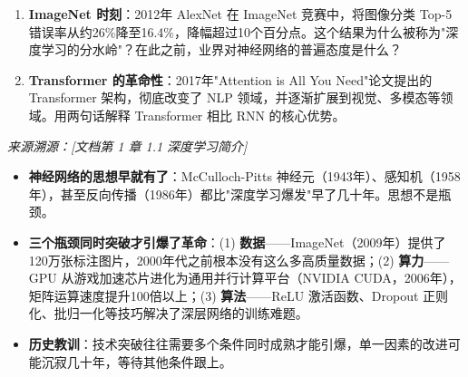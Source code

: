 \documentclass[a4paper,11pt]{ctexart}
\begin{document}
\begin{problembox}
\begin{enumerate}[(1)]
        \item \textbf{ImageNet 时刻}：2012年 AlexNet 在 ImageNet 竞赛中，将图像分类 Top-5 错误率从约26\%降至16.4\%，降幅超过10个百分点。这个结果为什么被称为"深度学习的分水岭"？在此之前，业界对神经网络的普遍态度是什么？

        \item \textbf{Transformer 的革命性}：2017年"Attention is All You Need"论文提出的 Transformer 架构，彻底改变了 NLP 领域，并逐渐扩展到视觉、多模态等领域。用两句话解释 Transformer 相比 RNN 的核心优势。
    \end{enumerate}

    \vspace{0.2cm}
    {\color{gray}\small\textit{来源溯源：[文档第 1 章 1.1 深度学习简介]}}
\end{problembox}

\begin{beginnerbox}
    \begin{itemize}
        \item \textbf{神经网络的思想早就有了}：McCulloch-Pitts 神经元（1943年）、感知机（1958年），甚至反向传播（1986年）都比"深度学习爆发"早了几十年。思想不是瓶颈。
        \item \textbf{三个瓶颈同时突破才引爆了革命}：(1) \textbf{数据}——ImageNet（2009年）提供了120万张标注图片，2000年代之前根本没有这么多高质量数据；(2) \textbf{算力}——GPU 从游戏加速芯片进化为通用并行计算平台（NVIDIA CUDA，2006年），矩阵运算速度提升100倍以上；(3) \textbf{算法}——ReLU 激活函数、Dropout 正则化、批归一化等技巧解决了深层网络的训练难题。
        \item \textbf{历史教训}：技术突破往往需要多个条件同时成熟才能引爆，单一因素的改进可能沉寂几十年，等待其他条件跟上。
    \end{itemize}
\end{beginnerbox}
\end{document}

